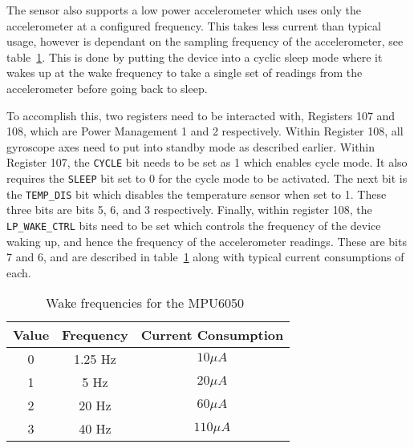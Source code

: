 The sensor also supports a low power accelerometer which uses only the accelerometer at a configured frequency. This takes less current than typical usage, however is dependant on the sampling frequency of the accelerometer, see table~\ref{tab:sensor:wake}. This is done by putting the device into a cyclic sleep mode where it wakes up at the wake frequency to take a single set of readings from the accelerometer before going back to sleep. 

To accomplish this, two registers need to be interacted with, Registers 107 and 108, which are Power Management 1 and 2 respectively. Within Register 108, all gyroscope axes need to put into standby mode as described earlier. Within Register 107, the \verb|CYCLE| bit needs to be set as 1 which enables cycle mode. It also requires the \verb|SLEEP| bit set to 0 for the cycle mode to be activated. The next bit is the \verb|TEMP_DIS| bit which disables the temperature sensor when set to 1. These three bits are bits 5, 6, and 3 respectively. Finally, within register 108, the \verb|LP_WAKE_CTRL| bits need to be set which controls the frequency of the device waking up, and hence the frequency of the accelerometer readings. These are bits 7 and 6, and are described in table~\ref{tab:sensor:wake} along with typical current consumptions of each. 

\begin{table}
	\centering
	\begin{tabular}{|c|c|c|}
		\hline
		Value & Frequency & Current Consumption \\
		\hline
		0 & 1.25 Hz & $10\mu A$ \\
		1 & 5 Hz & $20\mu A$ \\
		2 & 20 Hz & $60\mu A$ \\
		3 & 40 Hz & $110\mu A$ \\
		\hline
	\end{tabular}
	\caption{Wake frequencies for the MPU6050~\cite{sensor_registers}}
	\label{tab:sensor:wake}
\end{table}
